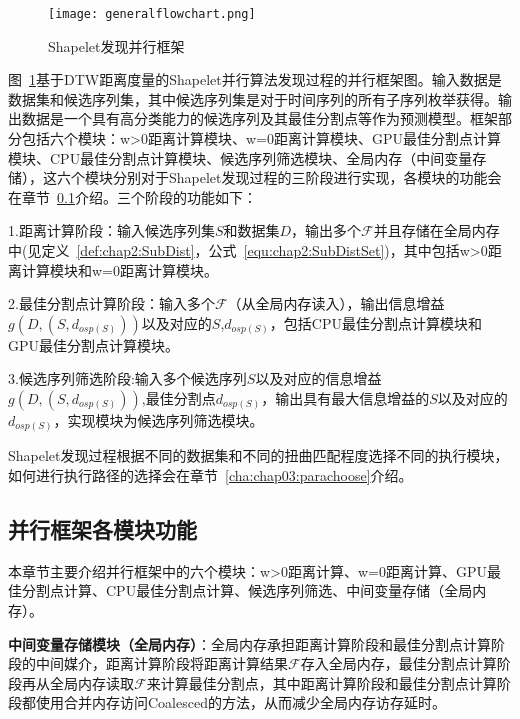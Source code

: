 \begin{figure}[H] %
	\centering
	\texttt{[image: generalflowchart.png]}
	\caption{Shapelet发现并行框架}
	\label{fig:generalflow}
\end{figure}

图~\ref{fig:generalflow}基于DTW距离度量的Shapelet并行算法发现过程的并行框架图。输入数据是数据集和候选序列集，其中候选序列集是对于时间序列的所有子序列枚举获得。输出数据是一个具有高分类能力的候选序列及其最佳分割点等作为预测模型。框架部分包括六个模块：w>0距离计算模块、w=0距离计算模块、GPU最佳分割点计算模块、CPU最佳分割点计算模块、候选序列筛选模块、全局内存（中间变量存储），这六个模块分别对于Shapelet发现过程的三阶段进行实现，各模块的功能会在章节~\ref{cha:chap03:modelduty}介绍。三个阶段的功能如下：

1.距离计算阶段：输入候选序列集$S$和数据集$D$，输出多个$\mathcal{F}$并且存储在全局内存中(见定义~\ref{def:chap2:SubDist}，公式~\ref{equ:chap2:SubDistSet})，其中包括w>0距离计算模块和w=0距离计算模块。 

2.最佳分割点计算阶段：输入多个$\mathcal{F}$（从全局内存读入），输出信息增益$g(D,(S,d_{osp(S)}))$以及对应的$S$,$d_{osp(S)}$，包括CPU最佳分割点计算模块和GPU最佳分割点计算模块。

3.候选序列筛选阶段:输入多个候选序列$S$以及对应的信息增益$g(D,(S,d_{osp(S)}))$,最佳分割点$d_{osp(S)}$，输出具有最大信息增益的$S$以及对应的$d_{osp(S)}$，实现模块为候选序列筛选模块。

Shapelet发现过程根据不同的数据集和不同的扭曲匹配程度选择不同的执行模块，如何进行执行路径的选择会在章节~\ref{cha:chap03:parachoose}介绍。

\subsection{并行框架各模块功能}
\label{cha:chap03:modelduty}

本章节主要介绍并行框架中的六个模块：w>0距离计算、w=0距离计算、GPU最佳分割点计算、CPU最佳分割点计算、候选序列筛选、中间变量存储（全局内存）。

\textbf{中间变量存储模块（全局内存）}：全局内存承担距离计算阶段和最佳分割点计算阶段的中间媒介，距离计算阶段将距离计算结果$\mathcal{F}$存入全局内存，最佳分割点计算阶段再从全局内存读取$\mathcal{F}$来计算最佳分割点，其中距离计算阶段和最佳分割点计算阶段都使用合并内存访问Coalesced的方法，从而减少全局内存访存延时。

